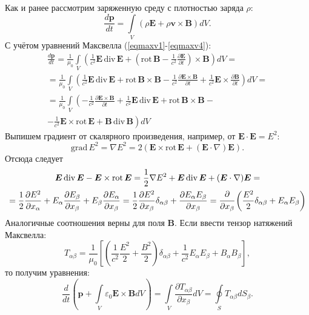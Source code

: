 \documentclass[a4paper,14pt]{extreport} %
\newcommand{\df}[1]{\cfrac{\partial}{\partial #1}}
\newcommand{\dff}[2]{\frac{\partial #1}{\partial #2}}
\newcommand{\Df}[1]{\frac{d}{d #1}}
\newcommand{\Dff}[2]{\frac{d #1}{d #2}}
\renewcommand{\vec}[1]{\boldsymbol{#1}}
\renewcommand{\div}{\mathrm{div}\,}
\newcommand{\rot}{\mathrm{rot}\,}
\newcommand{\grad}{\mathrm{grad}\,}
\newcommand{\eps}{\varepsilon}
\begin{document}
	Как и ранее рассмотрим заряженную среду с плотностью заряда $\rho$:
	\begin{equation*}
		\Dff{\vec{p}}{t} = \int\limits_{V} (\rho \vec{E} + \rho \vec{v}\times\vec{B} ) dV.
	\end{equation*}
	С учётом уравнений Максвелла (\ref{eqmaxv1}-\ref{eqmaxv4}):
	\begin{gather*}
		\Dff{\vec{p}}{t} = 
		\frac{1}{\mu_0}\int\limits_{V} \left( \frac{1}{c^2} \vec{E}\, \div \vec{E} + \left(\rot \vec{B} - \frac{1}{c^2} \dff{\vec{E}}{t} \right)\times\vec{B} \right) dV = \\ 
		= 
		\frac{1}{\mu_0}\int\limits_{V} \left( \frac{1}{c^2} \vec{E}\, \div \vec{E} + \rot \vec{B}\times\vec{B} - \frac{1}{c^2} \dff{\vec{E}\times\vec{B}}{t} +  \frac{1}{c^2} \vec{E}\times\dff{\vec{B}}{t} \right) dV = \\
		= 
		\frac{1}{\mu_0}\int\limits_{V} \left( - \frac{1}{c^2} \dff{\vec{E}\times\vec{B}}{t} + \frac{1}{c^2} \vec{E}\, \div \vec{E} + \rot \vec{B}\times\vec{B} - \right. \\ 
		\left. -  \frac{1}{c^2} \vec{E}\times\rot \vec{E} + \vec{B}\,\div \vec{B} \right) dV
	\end{gather*}
	Выпишем градиент от скалярного произведения, например, от $\vec{E}\cdot\vec{E} = E^2$:
	\begin{equation*}
		\grad E^2 = \nabla E^2 = 2 (\vec{E} \times \rot \vec{E} + (\vec{E}\cdot\nabla)\vec{E}).
	\end{equation*}
	Отсюда следует
	\begin{gather*}
		\vec{E}\, \div \vec{E} - \vec{E}\times\rot \vec{E} = \frac{1}{2} \nabla E^2 + \vec{E}\, \div \vec{E} + (\vec{E}\cdot\nabla)\vec{E} = \\
		= \frac{1}{2} \dff{E^2}{x_\alpha} + E_\alpha\dff{E_\beta}{x_\beta} + E_\beta\dff{E_\alpha}{x_\beta} = 
		\frac{1}{2} \dff{E^2}{x_\beta}\delta_{\alpha\beta} + \dff{E_\alpha E_\beta}{x_\beta} = 
		\df{x_\beta} 
		\left(
			\frac{E^2}{2}\delta_{\alpha\beta} + E_\alpha E_\beta
		\right)
	\end{gather*}
	Аналогичные соотношения верны для поля $\vec{B}$. Если ввести тензор натяжений Максвелла:
	\begin{equation*}
		T_{\alpha\beta} = \frac{1}{\mu_0} \left[ \left(\frac{1}{c^2}\frac{E^2}{2} + \frac{B^2}{2}\right)\delta_{\alpha\beta} + \frac{1}{c^2}E_\alpha E_\beta + B_\alpha B_\beta\right],
	\end{equation*}
	то получим уравнения:
	\begin{equation*}
		\Df{t} \left(\vec{p} + \int\limits_{V} \eps_0 \vec{E}\times\vec{B} dV\right) =
		\int\limits_{V} \dff{T_{\alpha\beta}}{x_\beta} dV = \oint\limits_{S} T_{\alpha\beta} dS_\beta.
	\end{equation*}
\end{document}
